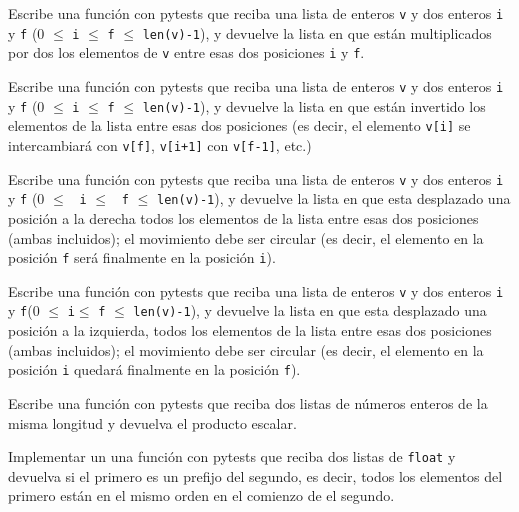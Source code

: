 \begin{ejercicio}Escribe una función con pytests  que reciba una lista de enteros
   \verb#v# y dos enteros \verb#i# y \verb#f# (0 $\le$ \verb#i# $\le$
   \verb#f# $\le$ \verb#len(v)-1#), y devuelve la lista en que están multiplicados por dos
   los elementos de \verb#v# entre esas dos posiciones \verb#i# y
   \verb#f#.
\end{ejercicio}
\begin{ejercicio}Escribe una función con pytests  que reciba una lista de enteros
   \verb#v# y dos enteros \verb#i# y \verb#f# (0 $\le$ \verb#i# $\le$
   \verb#f# $\le$ \verb#len(v)-1#), y devuelve la lista en que están invertido los elementos
   de la lista entre esas dos posiciones (es decir, el elemento
   \verb#v[i]# se intercambiar\'a con \verb#v[f]#, \verb#v[i+1]# con
   \verb#v[f-1]#, etc.)
\end{ejercicio}
\begin{ejercicio}Escribe una función con pytests  que reciba una lista de enteros
  \verb#v# y dos enteros \verb#i# y \verb#f# (0 $\le$ \verb# i# $\le$
  \verb# f# $\le$ \verb#len(v)-1#), y devuelve la lista en que esta desplazado una
  posici\'on a la derecha todos los elementos de la lista entre esas
  dos posiciones (ambas incluidos); el movimiento debe ser circular
  (es decir, el elemento en la posici\'on \verb#f# ser\'a finalmente en
  la posici\'on \verb#i#).
\end{ejercicio}
\begin{ejercicio}Escribe una función con pytests  que reciba una lista de enteros
  \verb#v# y dos enteros \verb#i# y \verb#f#(0 $\le$ \verb#i#$\le$
  \verb#f# $\le$ \verb#len(v)-1#), y devuelve la lista en que esta desplazado una
  posici\'on a la izquierda, todos los elementos de la lista entre
  esas dos posiciones (ambas incluidos); el movimiento debe ser
  circular (es decir, el elemento en la posici\'on \verb#i# quedar\'a
  finalmente en la posici\'on \verb#f#).

\end{ejercicio}
\begin{ejercicio}Escribe una función con pytests  que reciba dos listas de
  n\'umeros enteros de la misma longitud y devuelva el producto
  escalar.
\end{ejercicio}
\begin{ejercicio}Implementar un una función con pytests  que reciba dos listas de
  \texttt{float} y devuelva si el primero es un prefijo del
  segundo, es decir, todos los elementos del primero est\'an en el
  mismo orden en el comienzo de el segundo.
\end{ejercicio}
